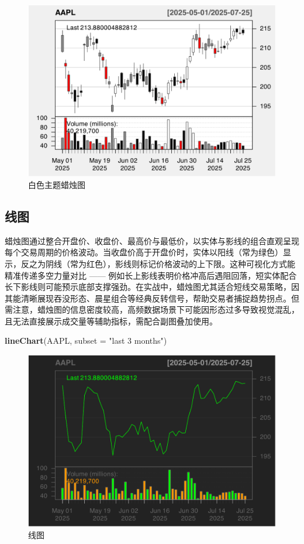 \documentclass[]{ctexbook}
\newenvironment{Shaded}{\begin{snugshade}}{\end{snugshade}}
\newcommand{\AttributeTok}[1]{\textcolor[rgb]{0.13,0.29,0.53}{#1}}
\newcommand{\FunctionTok}[1]{\textcolor[rgb]{0.13,0.29,0.53}{\textbf{#1}}}
\newcommand{\NormalTok}[1]{#1}
\newcommand{\StringTok}[1]{\textcolor[rgb]{0.31,0.60,0.02}{#1}}
\begin{document}
\begin{figure}
\includegraphics[width=0.9\linewidth]{QuantmodHandbook_files/figure-latex/cadleWhite-1} \caption{白色主题蜡烛图}\label{fig:cadleWhite}
\end{figure}

\subsection{线图}\label{ux7ebfux56fe}

蜡烛图通过整合开盘价、收盘价、最高价与最低价，以实体与影线的组合直观呈现每个交易周期的价格波动。当收盘价高于开盘价时，实体以阳线（常为绿色）显示，反之为阴线（常为红色），影线则标记价格波动的上下限。这种可视化方式能精准传递多空力量对比 ------ 例如长上影线表明价格冲高后遇阻回落，短实体配合长下影线则可能预示底部支撑强劲。在实战中，蜡烛图尤其适合短线交易策略，因其能清晰展现吞没形态、晨星组合等经典反转信号，帮助交易者捕捉趋势拐点。但需注意，蜡烛图的信息密度较高，高频数据场景下可能因形态过多导致视觉混乱，且无法直接展示成交量等辅助指标，需配合副图叠加使用。

\begin{Shaded}
\begin{Highlighting}[]
\FunctionTok{lineChart}\NormalTok{(AAPL, }\AttributeTok{subset =} \StringTok{"last 3 months"}\NormalTok{)}
\end{Highlighting}
\end{Shaded}

\begin{figure}
\includegraphics[width=0.9\linewidth]{QuantmodHandbook_files/figure-latex/line-1} \caption{线图}\label{fig:line}
\end{figure}
\end{document}
